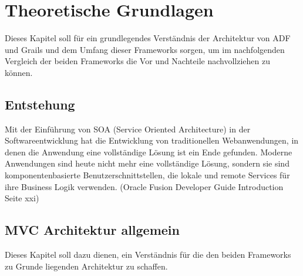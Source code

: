 \section{Theoretische Grundlagen}
Dieses Kapitel soll für ein grundlegendes Verständnis der Architektur von ADF und Grails und dem Umfang dieser Frameworks sorgen, um im nachfolgenden Vergleich der beiden Frameworks die Vor und Nachteile nachvollziehen zu können.
\subsection{Entstehung}
Mit der Einführung von SOA (Service Oriented Architecture) in der Softwareentwicklung hat die Entwicklung von traditionellen Webanwendungen, in denen die Anwendung eine vollständige Lösung ist ein Ende gefunden. Moderne Anwendungen sind heute nicht mehr eine vollständige Lösung, sondern sie sind komponentenbasierte Benutzerschnittstellen, die lokale und remote Services für ihre Business Logik verwenden. (Oracle Fusion Developer Guide Introduction Seite xxi)
\subsection{MVC Architektur allgemein}
Dieses Kapitel soll dazu dienen, ein Verständnis für die den beiden Frameworks zu Grunde liegenden Architektur zu schaffen.\\


